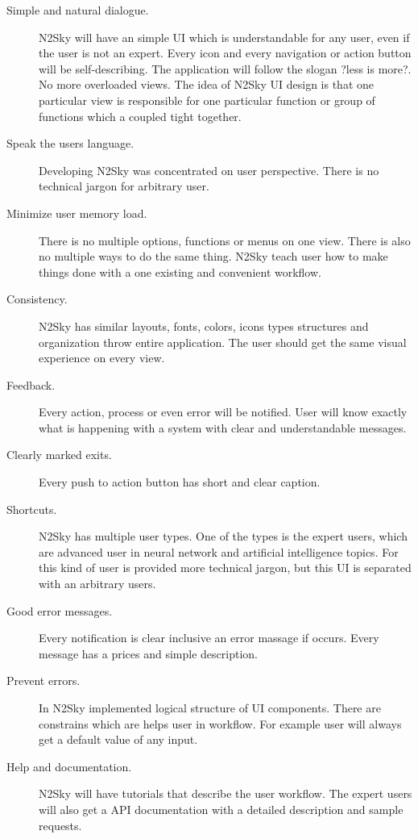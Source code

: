 \begin{description}
\item[Simple and natural dialogue.]  N2Sky will have an simple UI which is understandable for any user, even if the user is not an expert. Every icon and every navigation or action button will be self-describing. The application will follow the slogan ?less is more?. No more overloaded views. The idea of N2Sky UI design is that one particular view is responsible for one particular function or group of functions which a coupled tight together.
\item[Speak the users language.] Developing N2Sky was concentrated on user perspective. There is no technical jargon for arbitrary user.
\item[Minimize user memory load.] There is no multiple options, functions or menus on one view. There is also no multiple ways to do the same thing. N2Sky teach user how to make things done with a one existing and convenient workflow. 
\item[Consistency.] N2Sky has similar layouts, fonts, colors, icons types structures and organization throw entire application. The user should get the same visual experience on every view.
\item[Feedback.] Every action, process or even error will be notified. User will know exactly what is happening with a system with clear and understandable messages.
\item[Clearly marked exits.]  Every push to action button has short and clear caption.
\item[Shortcuts.] N2Sky has multiple user types. One of the types is the expert users, which are advanced user in neural network and artificial intelligence topics. For this kind of user is provided more technical jargon, but this UI is separated with an arbitrary users.  
\item[Good error messages.] Every notification is clear inclusive an error massage if occurs. Every message has a prices and simple description.
\item[Prevent errors.] In N2Sky implemented logical structure of UI components. There are constrains which are helps user in workflow. For example user will always get a default value of any input.
\item[Help and documentation.] N2Sky will have tutorials that describe the user workflow. The expert users will also get a API documentation with a detailed description and sample requests. 

\end{description}

